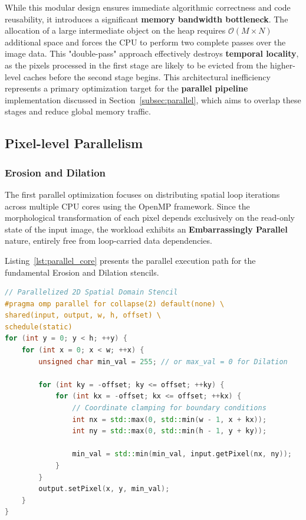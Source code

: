 \documentclass[10pt,twocolumn,letterpaper]{article}
\begin{document}
While this modular design ensures immediate algorithmic correctness and code reusability, it introduces a significant \textbf{memory bandwidth bottleneck}. The allocation of a large intermediate object on the heap requires $\mathcal{O}(M \times N)$ additional space and forces the CPU to perform two complete passes over the image data. This "double-pass" approach effectively destroys \textbf{temporal locality}, as the pixels processed in the first stage are likely to be evicted from the higher-level caches before the second stage begins. 
This architectural inefficiency represents a primary optimization target for the \textbf{parallel pipeline} implementation discussed in Section~\ref{subsec:parallel}, which aims to overlap these stages and reduce global memory traffic.

\subsection{Pixel-level Parallelism}

\subsubsection{Erosion and Dilation}
The first parallel optimization focuses on distributing spatial loop iterations across multiple CPU cores using the OpenMP framework. Since the morphological transformation of each pixel depends exclusively on the read-only state of the input image, the workload exhibits an \textbf{Embarrassingly Parallel} nature, entirely free from loop-carried data dependencies.

Listing~\ref{lst:parallel_core} presents the parallel execution path for the fundamental Erosion and Dilation stencils.

\begin{lstlisting}[language=C++, caption={OpenMP shared-memory implementation of parallel Erosion and Dilation.}, label={lst:parallel_core}, basicstyle=\ttfamily\footnotesize, frame=single, breaklines=true]
// Parallelized 2D Spatial Domain Stencil
#pragma omp parallel for collapse(2) default(none) \
shared(input, output, w, h, offset) \
schedule(static)
for (int y = 0; y < h; ++y) {
    for (int x = 0; x < w; ++x) {
        unsigned char min_val = 255; // or max_val = 0 for Dilation

        for (int ky = -offset; ky <= offset; ++ky) {
            for (int kx = -offset; kx <= offset; ++kx) {
                // Coordinate clamping for boundary conditions
                int nx = std::max(0, std::min(w - 1, x + kx));
                int ny = std::max(0, std::min(h - 1, y + ky));

                min_val = std::min(min_val, input.getPixel(nx, ny));
            }
        }
        output.setPixel(x, y, min_val);
    }
}
\end{lstlisting}
\end{document}
